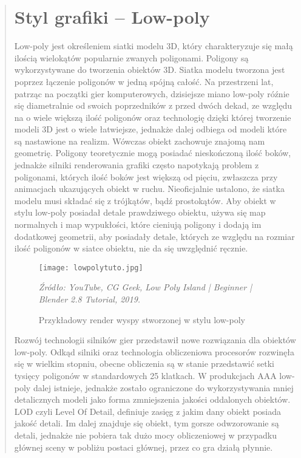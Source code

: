 \begin{quotation}
\section{Styl grafiki -- Low-poly}

\indent Low-poly jest określeniem siatki modelu 3D, który charakteryzuje się małą ilością wielokątów popularnie zwanych poligonami. Poligony są wykorzystywane do tworzenia obiektów 3D. Siatka modelu tworzona jest poprzez łączenie poligonów w jedną spójną całość. Na przestrzeni lat, patrząc na początki gier komputerowych, dzisiejsze miano low-poly róźnie się diametralnie od swoich poprzedników z przed dwóch dekad, ze względu na o wiele większą ilość poligonów oraz technologię dzięki której tworzenie modeli 3D jest o wiele łatwiejsze, jednakże dalej odbiega od modeli które są nastawione na realizm. Wówczas obiekt zachowuje znajomą nam geometrię. Poligony teoretycznie mogą posiadać nieskończoną ilość boków, jednakże silniki renderowania grafiki często napotykają problem z poligonami, których ilość boków jest większą od pięciu, zwłaszcza przy animacjach ukazujących obiekt w ruchu. Nieoficjalnie ustalono, że siatka modelu musi składać się z trójkątów, bądź prostokątów. Aby obiekt w stylu low-poly posiadał detale prawdziwego obiektu, używa się map normalnych i map wypukłości, które cieniują poligony i dodają im dodatkowej geometrii, aby posiadały detale, których ze względu na rozmiar ilość poligonów w siatce obiektu, nie da się uwzględnić ręcznie. 


\begin{figure}[hbt!]
\centering
  \texttt{[image: lowpolytuto.jpg]}
  \caption{Przykładowy render wyspy stworzonej w stylu low-poly}\label{rys_1}
  \begin{minipage}[t]{0.75\linewidth}
    \emph{Źródło: YouTube, CG Geek, Low Poly Island | Beginner | Blender 2.8 Tutorial, 2019.}
  \end{minipage}
\end{figure}

\newpage
\indent Rozwój technologii silników gier przedstawił nowe rozwiązania dla obiektów low-poly. Odkąd silniki oraz technologia obliczeniowa procesorów rozwinęła się w wielkim stopniu, obecne obliczenia są w stanie przedstawić setki tysięcy poligonów w standardowych 25 klatkach. 
W produkcjach AAA low-poly dalej istnieje, jednakże zostało ograniczone do wykorzystywania mniej detalicznych modeli jako forma zmniejszenia jakości oddalonych obiektów. LOD czyli Level Of Detail, definiuje zasięg z jakim dany obiekt posiada jakość detali. Im dalej znajduje się obiekt, tym gorsze odwzorowanie są detali, jednakże nie pobiera tak dużo mocy obliczeniowej w przypadku głównej sceny w pobliżu postaci głównej, przez co gra działą płynnie. \cite{1}


\end{quotation}
